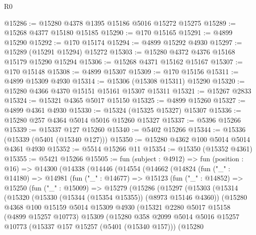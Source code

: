 \begin{lexlean}{R0}
\begin{coremodule}
@15286 := @15280 @4378 @1395 @15186 @5016 @15272 @15275
@15289 := @15268 @4377 @15180 @15185
@15290 := @170 @15165
@15291 := @4899 @15290
@15292 := @170 @15174
@15294 := @4899 @15292 @4930
@15297 := @15289 (@15291 @15294) @15272
@15303 := @15280 @4372 @4376 @15168 @15179 @15290 @15294
@15306 := @15268 @4371 @15162 @15167
@15307 := @170 @15148
@15308 := @4899 @15307
@15309 := @170 @15156
@15311 := @4899 @15309 @4930
@15314 := @15306 (@15308 @15311) @15290
@15320 := @15280 @4366 @4370 @15151 @15161 @15307 @15311
@15321 := @15267 @2833
@15324 := @15321 @4365 @5017 @15150
@15325 := @4899 @15260
@15327 := @4899 @4361 @4930
@15330 := @15324 (@15325 @15327) @15307
@15336 := @15280 @257 @4364 @5014 @5016 @15260 @15327
@15337 := @5396 @15266
@15339 := @15337 @127 @15260
@15340 := @5402 @15266
@15344 := @15336 (@15339 (@5401 (@15340 @127)))
@15350 := @15280 @4362 @100 @5014 @5014 @4361 @4930
@15352 := @5514 @15266 @11
@15354 := @15350 (@15352 @4361)
@15355 := @5421 @15266
@15505 := fun (subject : @4912) =>
  fun (position : @16) =>
  @14300
    (@14338
      (@14446
        (@14554
          (@14662
            (@14824
              (fun ("_" : @14180) =>
              @14981
                (fun ("_" : @14677) =>
                @15123
                  (fun ("_" : @14852) =>
                  @15250
                    (fun ("_" : @15009) =>
                    @15279
                      (@15286
                        (@15297
                          (@15303
                            (@15314
                              (@15320
                                (@15330 (@15344 (@15354 @15355)) (@8973 @15146 @4360))
                                (@15280
                                  @4368
                                  @100
                                  @15159
                                  @5014
                                  @15309
                                  @4930
                                  (@15321
                                    @2280
                                    @5017
                                    @15158
                                    (@4899 @15257 @10773)
                                    @15309
                                    (@15280
                                      @358
                                      @2099
                                      @5014
                                      @5016
                                      @15257
                                      @10773
                                      (@15337 @157 @15257 (@5401 (@15340 @157)))
                                      (@15280

\end{coremodule}
\end{lexlean}
